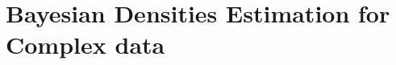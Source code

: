 \documentclass[11pt]{beamer}
\begin{document}






\section{Bayesian Densities Estimation for Complex data}
\end{document}
